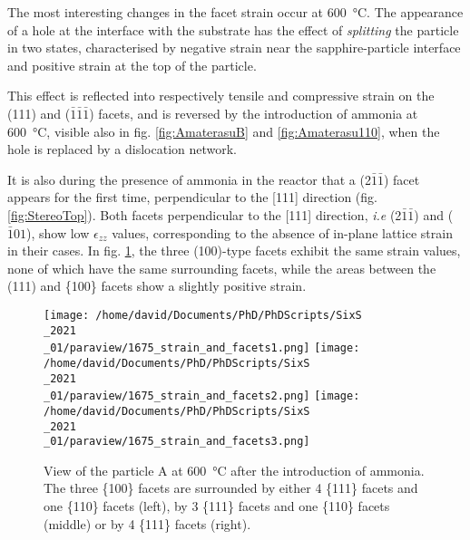 The most interesting changes in the facet strain occur at \qty{600}{\degreeCelsius}.
The appearance of a hole at the interface with the substrate has the effect of \textit{splitting} the particle in two states, characterised by negative strain near the sapphire-particle interface and positive strain at the top of the particle.

This effect is reflected into respectively tensile and compressive strain on the (111) and ($\bar{1}\bar{1}\bar{1}$) facets, and is reversed by the introduction of ammonia at \qty{600}{\degreeCelsius}, visible also in fig. \ref{fig:AmaterasuB} and \ref{fig:Amaterasu110}, when the hole is replaced by a dislocation network.

It is also during the presence of ammonia in the reactor that a (2$\bar{1}\bar{1}$) facet appears for the first time, perpendicular to the [111] direction (fig. \ref{fig:StereoTop}).
Both facets perpendicular to the [111] direction, \textit{i.e} (2$\bar{1}\bar{1}$) and ($\bar{1}01$), show low $\epsilon_{zz}$ values, corresponding to the absence of in-plane lattice strain in their cases.
In fig. \ref{fig:AmaterasuStrain1675}, the three (100)-type facets exhibit the same strain values, none of which have the same surrounding facets, while the areas between the (111) and \{100\} facets show a slightly positive strain.

\begin{figure}[!htb]
    \centering
    \texttt{[image: /home/david/Documents/PhD/PhDScripts/SixS\\\_2021\\\_01/paraview/1675\_strain\_and\_facets1.png]}
    \texttt{[image: /home/david/Documents/PhD/PhDScripts/SixS\\\_2021\\\_01/paraview/1675\_strain\_and\_facets2.png]}
    \texttt{[image: /home/david/Documents/PhD/PhDScripts/SixS\\\_2021\\\_01/paraview/1675\_strain\_and\_facets3.png]}
    \caption{
        View of the particle A at \qty{600}{\degreeCelsius} after the introduction of ammonia.
        The three \{100\} facets are surrounded by either 4 \{111\} facets and one \{110\} facets (left), by 3 \{111\} facets and one \{110\} facets (middle) or by 4 \{111\} facets (right).
    }
    \label{fig:AmaterasuStrain1675}
\end{figure}

